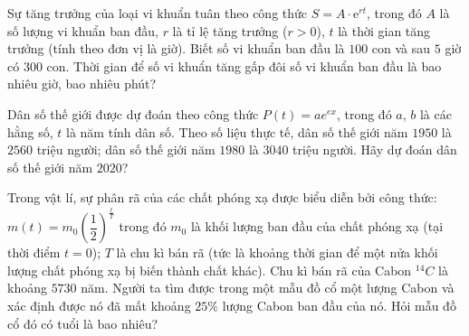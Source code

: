 \begin{vd}%
	Sự tăng trưởng của loại vi khuẩn tuân theo công thức $ S=A\cdot \mathrm{e}^{rt} $, trong đó $ A $ là số lượng vi khuẩn ban đầu, $ r $ là tỉ lệ tăng trưởng ($ r>0 $), $ t $ là thời gian tăng trưởng (tính theo đơn vị là giờ). Biết số vi khuẩn ban đầu là $ 100 $ con và sau $ 5 $ giờ có $ 300 $ con. Thời gian để số vi khuẩn tăng gấp đôi số vi khuẩn ban đầu là bao nhiêu giờ, bao nhiêu phút?
\end{vd}

\begin{vd}%
	Dân số thế giới được dự đoán theo công thức $P(t)=ae^{ex}$, trong đó $a$, $b$ là các hằng số, $t$ là năm tính dân số. Theo số liệu thực tế, dân số thế giới năm $1950$ là $2560$ triệu người; dân số thế giới năm $1980$ là $3040$ triệu người. Hãy dự đoán dân số thế giới năm $2020$?
\end{vd}

\begin{vd}%
	Trong vật lí, sự phân rã của các chất phóng xạ được biểu diễn bởi công thức: $m\left( t \right) = {m_0}{\left( {\dfrac{1}{2}} \right)^{\frac{t}{T}}}$ trong đó ${m_0}$ là khối lượng ban đầu của chất phóng xạ (tại thời điểm $t = 0$); $T$ là chu kì bán rã (tức là khoảng thời gian để một nửa khối lượng chất phóng xạ bị biến thành chất khác). Chu kì bán rã của Cabon $^{14}C$ là khoảng $5730$ năm. Người ta tìm được trong một mẫu đồ cổ một lượng Cabon và xác định được nó đã mất khoảng $25\%$ lượng Cabon ban đầu của nó. Hỏi mẫu đồ cổ đó có tuổi là bao nhiêu?
	
\end{vd}

